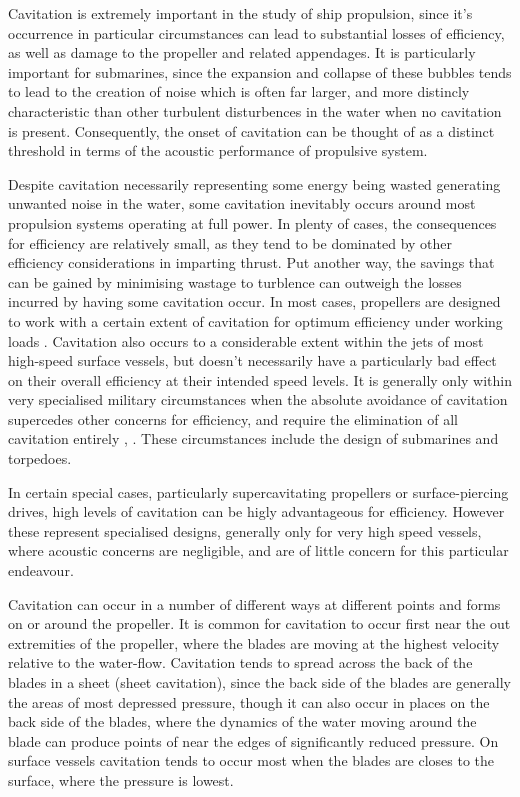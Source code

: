 \documentclass{article}\usepackage[]{graphicx}\usepackage[]{color}
\begin{document}
Cavitation is extremely important in the study of ship propulsion, since it's occurrence in particular circumstances can lead to substantial losses of efficiency, as well as damage to the propeller and related appendages. It is particularly important for submarines, since the expansion and collapse of these bubbles tends to lead to the creation of noise which is often far larger, and more distincly characteristic than other turbulent disturbences in the water when no cavitation is present.  Consequently, the onset of cavitation can be thought of as a distinct threshold in terms of the acoustic performance of propulsive system.

Despite cavitation necessarily representing some energy being wasted generating unwanted noise in the water, some cavitation inevitably occurs around most propulsion systems operating at full power.  In plenty of cases, the consequences for efficiency are relatively small, as they tend to be dominated by other efficiency considerations in imparting thrust.  Put another way, the savings that can be gained by minimising wastage to turblence can outweigh the losses incurred by having some cavitation occur.  In most cases, propellers are designed to work with a certain extent of cavitation for optimum efficiency under working loads \parencite{shin2015}. Cavitation also occurs to a considerable extent within the jets of most high-speed surface vessels, but doesn't necessarily have a particularly bad effect on their overall efficiency at their intended speed levels.  It is generally only within very specialised military circumstances when the absolute avoidance of cavitation supercedes other concerns for efficiency, and require the elimination of all cavitation entirely \parencite{mollard2011}, \parencite{lewis1988}.  These circumstances include the design of submarines and torpedoes.

In certain special cases, particularly supercavitating propellers or surface-piercing drives, high levels of cavitation can be higly advantageous for efficiency.  However these represent specialised designs, generally only for very high speed vessels, where acoustic concerns are negligible, and are of little concern for this particular endeavour.

Cavitation can occur in a number of different ways at different points and forms on or around the propeller.  It is common for cavitation to occur first near the out extremities of the propeller, where the blades are moving at the highest velocity relative to the water-flow.  Cavitation tends to spread across the back of the blades in a sheet (sheet cavitation), since the back side of the blades are generally the areas of most depressed pressure, though it can also occur in places on the back side of the blades, where the dynamics of the water moving around the blade can produce points of near the edges of significantly reduced pressure. On surface vessels cavitation tends to occur most when the blades are closes to the surface, where the pressure is lowest.
\end{document}

